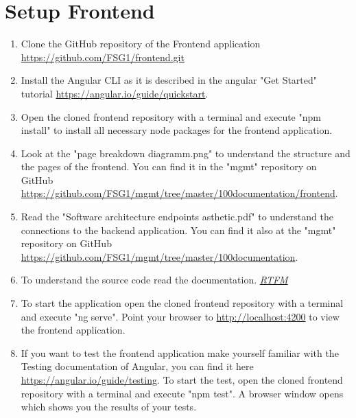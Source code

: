 \chapter{Setup Frontend}


\begin{enumerate}
	\item Clone the GitHub repository of the Frontend application \url{https://github.com/FSG1/frontend.git}
	
	\item Install the Angular CLI as it is described in the angular "Get Started" tutorial \url{https://angular.io/guide/quickstart}.
	
	\item Open the cloned frontend repository with a terminal and execute "npm install" to install all necessary node packages for the frontend application.
	
	\item Look at the "page breakdown diagramm.png" to understand the structure and the pages of the frontend. You can find it in the "mgmt" repository on GitHub \url{https://github.com/FSG1/mgmt/tree/master/100documentation/frontend}.
	
	\item Read the "Software architecture endpoints asthetic.pdf" to understand the connections to the backend application. You can find it also at the "mgmt" repository on GitHub \url{https://github.com/FSG1/mgmt/tree/master/100documentation}.
	
	\item To understand the source code read the documentation. \href{https://en.wikipedia.org/wiki/RTFM}{\textit{RTFM}}
	
	\item To start the application open the cloned frontend repository with a terminal and execute "ng serve". Point your browser to \url{http://localhost:4200} to view the frontend application.
	
	\item If you want to test the frontend application make yourself familiar with the Testing documentation of Angular, you can find it here \url{https://angular.io/guide/testing}. To start the test, open the cloned frontend repository with a terminal and execute "npm test". A browser window opens which shows you the results of your tests.
\end{enumerate}

